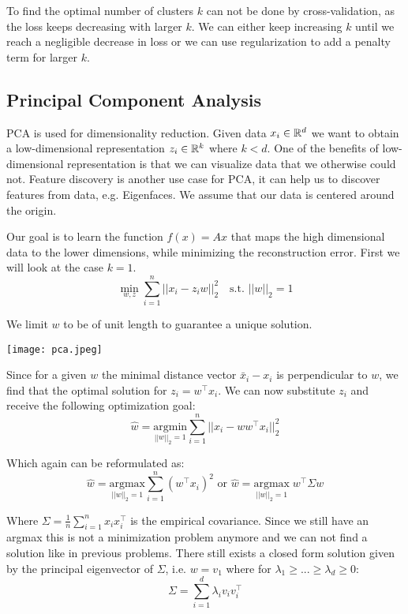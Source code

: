 To find the optimal number of clusters $k$ can not be done by cross-validation, as the loss keeps decreasing with larger $k$. We can either keep increasing $k$ until we reach a negligible decrease in loss or we can use regularization to add a penalty term for larger $k$.

\subsection{Principal Component Analysis}

PCA is used for dimensionality reduction. Given data $x_i \in \mathbb{R}^d$ we want to obtain a low-dimensional representation $z_i \in \mathbb{R}^k$ where $k < d$. One of the benefits of low-dimensional representation is that we can visualize data that we otherwise could not. Feature discovery is another use case for PCA, it can help us to discover features from data, e.g. Eigenfaces. We assume that our data is centered around the origin. 

Our goal is to learn the function $f(x) = Ax$ that maps the high dimensional data to the lower dimensions, while minimizing the reconstruction error. First we will look at the case $k = 1$.
$$\min_{w, z} \sum_{i=1}^n ||x_i - z_i w||_2^2 \quad \text{s.t. } ||w||_2 = 1$$

We limit $w$ to be of unit length to guarantee a unique solution.

\begin{center}
	\texttt{[image: pca.jpeg]}
\end{center}

Since for a given $w$ the minimal distance vector $\bar{x}_i - x_i$ is perpendicular to $w$, we find that the optimal solution for $z_i = w^\top x_i$. We can now substitute $z_i$ and receive the following optimization goal:
$$\hat{w} = \underset{||w||_2=1}{\text{argmin}} \sum_{i=1}^n ||x_i - w w^\top x_i||_2^2$$

Which again can be reformulated as:
$$\hat{w} = \underset{||w||_2=1}{\text{argmax}} \sum_{i=1}^n (w^\top x_i)^2 \text{ or } \hat{w} = \underset{||w||_2=1}{\text{argmax}} \; w^\top \Sigma w$$

Where $\Sigma = \frac{1}{n} \sum_{i=1}^n x_i x_i^\top$ is the empirical covariance. Since we still have an argmax this is not a minimization problem anymore and we can not find a solution like in previous problems. There still exists a closed form solution given by the principal eigenvector of $\Sigma$, i.e. $w = v_1$ where for $\lambda_1 \geq ... \geq \lambda_d \geq 0$:
$$\Sigma = \sum_{i=1}^d \lambda_i v_i v_i^\top$$

